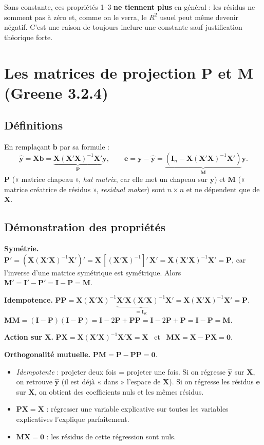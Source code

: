 \documentclass[11pt,a4paper]{article}
\newcommand{\vy}{\mathbf{y}}
\newcommand{\vX}{\mathbf{X}}
\newcommand{\ve}{\mathbf{e}}
\newcommand{\vb}{\mathbf{b}}
\newcommand{\Mm}{\mathbf{M}}
\newcommand{\Pm}{\mathbf{P}}
\newcommand{\I}{\mathbf{I}}
\newcommand{\XtX}{\vX'\vX}
\newcommand{\XtXi}{(\vX'\vX)^{-1}}
\begin{document}
\begin{attention}
Sans constante, ces propriétés 1--3 \textbf{ne tiennent plus} en général : les résidus ne somment pas à zéro et, comme on le verra, le $R^2$ usuel peut même devenir négatif. C'est une raison de toujours inclure une constante sauf justification théorique forte.
\end{attention}

\section{Les matrices de projection $\Pm$ et $\Mm$ (Greene 3.2.4)}

\subsection{Définitions}
En remplaçant $\vb$ par sa formule :
\[
\hat{\vy}=\vX\vb=\underbrace{\vX\XtXi\vX'}_{\Pm}\vy,\qquad
\ve=\vy-\hat{\vy}=\underbrace{(\I_n-\vX\XtXi\vX')}_{\Mm}\vy .
\]
$\Pm$ (« matrice chapeau », \emph{hat matrix}, car elle met un chapeau sur $\vy$) et $\Mm$ (« matrice créatrice de résidus », \emph{residual maker}) sont $n\times n$ et ne dépendent que de $\vX$.

\subsection{Démonstration des propriétés}
\begin{detail}
\textbf{Symétrie.} $\Pm'=(\vX\XtXi\vX')'=\vX\,[\XtXi]'\,\vX'=\vX\XtXi\vX'=\Pm$, car l'inverse d'une matrice symétrique est symétrique. Alors $\Mm'=\I'-\Pm'=\I-\Pm=\Mm$.

\textbf{Idempotence.} $\Pm\Pm=\vX\XtXi\underbrace{\vX'\vX\XtXi}_{=\I_K}\vX'=\vX\XtXi\vX'=\Pm$.
\\ $\Mm\Mm=(\I-\Pm)(\I-\Pm)=\I-2\Pm+\Pm\Pm=\I-2\Pm+\Pm=\I-\Pm=\Mm$.

\textbf{Action sur $\vX$.} $\Pm\vX=\vX\XtXi\XtX=\vX$ \ et \ $\Mm\vX=\vX-\Pm\vX=\mathbf 0$.

\textbf{Orthogonalité mutuelle.} $\Pm\Mm=\Pm-\Pm\Pm=\mathbf 0$.
\end{detail}

\begin{intuition}
\begin{itemize}[nosep]
\item \emph{Idempotente} : projeter deux fois = projeter une fois. Si on régresse $\hat{\vy}$ sur $\vX$, on retrouve $\hat{\vy}$ (il est déjà « dans » l'espace de $\vX$). Si on régresse les résidus $\ve$ sur $\vX$, on obtient des coefficients nuls et les mêmes résidus.
\item $\Pm\vX=\vX$ : régresser une variable explicative sur toutes les variables explicatives l'explique parfaitement.
\item $\Mm\vX=\mathbf 0$ : les résidus de cette régression sont nuls.
\end{itemize}
\end{intuition}
\end{document}
